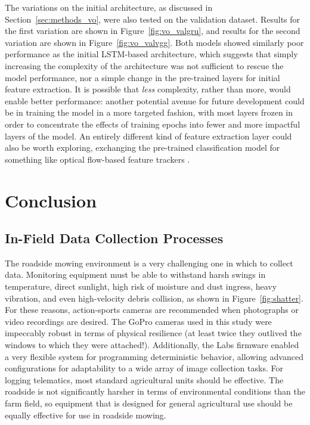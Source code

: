 \documentclass[
]{article}
\begin{document}
The variations on the initial architecture, as discussed in
Section~\ref{sec:methods_vo}, were also tested on the validation
dataset. Results for the first variation are shown in
Figure~\ref{fig:vo_valgru}, and results for the second variation are
shown in Figure~\ref{fig:vo_valvgg}. Both models showed similarly poor
performance as the initial LSTM-based architecture, which suggests that
simply increasing the complexity of the architecture was not sufficient
to rescue the model performance, nor a simple change in the pre-trained
layers for initial feature extraction. It is possible that \emph{less}
complexity, rather than more, would enable better performance: another
potential avenue for future development could be in training the model
in a more targeted fashion, with most layers frozen in order to
concentrate the effects of training epochs into fewer and more impactful
layers of the model. An entirely different kind of feature extraction
layer could also be worth exploring, exchanging the pre-trained
classification model for something like optical flow-based feature
trackers \parencite{Min_VoldorVisualOdometry_2020}.

\clearpage

\chapter{Conclusion}\label{conclusion}

\section{In-Field Data Collection Processes}\label{sec:conclude_data}

The roadside mowing environment is a very challenging one in which to
collect data. Monitoring equipment must be able to withstand harsh
swings in temperature, direct sunlight, high risk of moisture and dust
ingress, heavy vibration, and even high-velocity debris collision, as
shown in Figure~\ref{fig:shatter}. For these reasons, action-sports
cameras are recommended when photographs or video recordings are
desired. The GoPro cameras used in this study were impeccably robust in
terms of physical resilience (at least twice they outlived the windows
to which they were attached!). Additionally, the Labs firmware
\parencite{Newman_GoproLabs_2024} enabled a very flexible system for
programming deterministic behavior, allowing advanced configurations for
adaptability to a wide array of image collection tasks. For logging
telematics, most standard agricultural units should be effective. The
roadside is not significantly harsher in terms of environmental
conditions than the farm field, so equipment that is designed for
general agricultural use should be equally effective for use in roadside
mowing.
\end{document}

